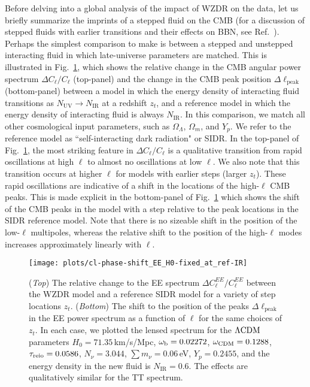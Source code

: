 \documentclass[aps,prd,twocolumn,nofootinbib,superscriptaddress]{revtex4}
\newcommand{\Fig}[1]{Fig.~\ref{fig:#1}}
\newcommand{\nir}{N_\text{IR}}
\newcommand{\nuv}{N_\text{UV}}
\newcommand{\zt}{z_t}
\newcommand{\LCDM}{\Lambda{\rm CDM}}
\begin{document}
Before delving into a global analysis of the impact of WZDR on the data, let us briefly summarize the imprints of a stepped fluid on the CMB (for a discussion of stepped fluids with earlier transitions and their effects on BBN, see Ref.~\cite{Berlin:2019pbq}). Perhaps the simplest comparison to make is between a stepped and unstepped interacting fluid in which late-universe parameters are matched. This is illustrated in \Fig{clwithstep}, which shows the relative change in the CMB angular power spectrum $\Delta C_\ell / C_\ell$ (top-panel) and the change in the CMB peak position $\Delta \ell_\text{peak}$ (bottom-panel) between a model in which the energy density of interacting fluid transitions as $\nuv \to \nir$ at a redshift $\zt$, and a reference model in which the energy density of interacting fluid is always $\nir$. In this comparison, we match all other cosmological input parameters, such as $\Omega_\Lambda$, $\Omega_m$, and $Y_p$. We refer to the reference model as ``self-interacting dark radiation" or SIDR. In the top-panel of \Fig{clwithstep}, the most striking feature  in $\Delta C_\ell / C_\ell$ is a qualitative transition from rapid oscillations at high $\ell$ to almost no oscillations at low $\ell$. We also note that this transition occurs at higher $\ell$ for models with earlier steps (larger $\zt$). These rapid oscillations are indicative of a shift in the locations of the high-$\ell$ CMB peaks. This is made explicit in the bottom-panel of  \Fig{clwithstep} which shows the shift of the CMB peaks in the model with a step relative to the peak locations in the SIDR reference model. Note that there is no sizeable shift in the position of the low-$\ell$ multipoles, whereas the relative shift to the position of the high-$\ell$ modes increases approximately linearly with $\ell$.

\begin{figure}[t]
\centering
\texttt{[image: plots/cl-phase-shift\_EE\_H0-fixed\_at\_ref-IR]} 
\caption{({\it Top}) The relative change to the EE spectrum $\Delta C_\ell^{EE} / C_\ell^{EE}$ between the WZDR model and a reference SIDR model for a variety of step locations $z_t$. ({\it Bottom}) The shift to the position of the peaks $\Delta \ell_\text{peak}$ in the EE power spectrum as a function of $\ell$ for the same choices of $z_t$. In each case, we plotted the lensed spectrum for the $\LCDM$ parameters $H_0=71.35\,$km/s/Mpc, $\omega_{\rm b}=0.02272$, $\omega_{\rm CDM}=0.1288$, $\tau_{\rm reio}=0.0586$, $N_{\nu}=3.044$, $\sum m_\nu=0.06\,$eV, $Y_p=0.2455$, and the energy density in the new fluid is $\nir = 0.6$. The effects are qualitatively similar for the TT spectrum.}
\label{fig:clwithstep}
\end{figure}
\end{document}
